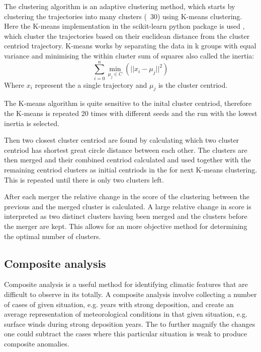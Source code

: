 The \textcite{dorling1992cluster} clustering algorithm is an adaptive clustering method, which starts by clustering the trajectories into many clusters (~30) using K-means clustering. Here the K-means implementation in the scikit-learn python package is used \parencite{scikit-learn}, which cluster the trajectories based on their euclidean distance from the cluster centriod trajectory. K-means works by separating the data in k groups with equal variance and minimising the within cluster sum of squares also called the inertia: 
\begin{equation}
    \sum_{i=0}^{n}\min_{\mu_j \in C}(||x_i - \mu_j||^2)
\end{equation}
Where $x_i$ represent the a single trajectory and $\mu_j$ is the cluster centriod. 

The K-means algorithm is quite sensitive to the inital cluster centriod, therefore the K-means is repeated 20 times with different seeds and the run with the lowest inertia is selected. 

Then two closest cluster centriod are found by calculating which two cluster centriod has shortest great circle distance between each other. The clusters are then merged and their combined centriod calculated and used together with the remaining centriod clusters as initial centriods in the for next K-means clustering. This is repeated until there is only two clusters left. 

After each merger the relative change in the score of the clustering between the previous and the merged cluster is calculated. A large relative change in score is interpreted as two distinct clusters having been merged and the clusters before the merger are kept. This allows for an more objective method for determining the optimal number of clusters.    

\subsection{Composite analysis}

Composite analysis is a useful method for identifying climatic features that are difficult to observe in its totally. A composite analysis involve collecting a number of cases of given situation, e.g. years with strong deposition, and create an average representation of meteorological conditions in that given situation, e.g. surface winds during strong deposition years. The to further magnify the changes one could subtract the cases where this particular situation is weak to produce composite anomalies.      


